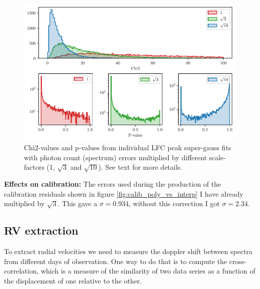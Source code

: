     \begin{figure}%
        \begin{wide}  
            \includegraphics[width=\textwidth]{figures/calib_errors2.pdf}
            \caption{Chi2-values and p-values from individual LFC peak super-gauss fits with photon count (spectrum) errors multiplied by different scale-factors (1, $\sqrt{3}$ and $\sqrt{10}$). See text for more details.}
        \label{fig:calib_errors}
        \end{wide}
    \end{figure}
    
    \bigbreak

    \noindent \textbf{Effects on calibration:} \newline
    The errors used during the production of the calibration residuals shown in figure \ref{fig:calib_poly_vs_interp} I have already multiplied by $\sqrt{3}$. This gave a $\sigma = 0.934$, without this correction I got $\sigma = 2.34$. 

\subsection{RV extraction}


    To extract radial velocities we need to measure the doppler shift between spectra from different days of observation. One way to do that is to compute the cross-correlation, which is a measure of the similarity of two data series as a function of the displacement of one relative to the other.
    
